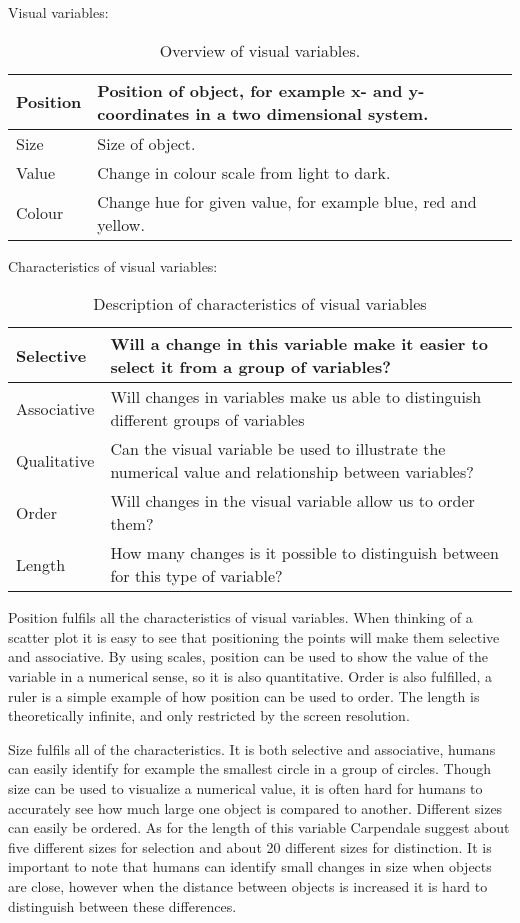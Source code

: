 Visual variables:
\begin{table}[h!]
  \begin{tabular}{|l|p{10cm}|}
      \hline
      Position    & Position of object, for example x- and y-coordinates in a two dimensional system. \\ \hline
      Size        & Size of object. \\ \hline
      Value       & Change in colour scale from light to dark. \\ \hline
      Colour      & Change hue for given value, for example blue, red and yellow. \\ \hline
  \end{tabular}
  \caption{Overview of visual variables.}
\end{table}

Characteristics of visual variables:
\begin{table}[h!]
  \begin{tabular}{|l|p{10cm}|}
      \hline
      Selective   & Will a change in this variable make it easier to select it from a group of variables? \\ \hline
        Associative & Will changes in variables make us able to distinguish different groups of variables \\ \hline 
        Qualitative & Can the visual variable be used to illustrate the numerical value and relationship between variables? \\ \hline
        Order       & Will changes in the visual variable allow us to order them? \\ \hline
        Length      & How many changes is it possible to distinguish between for this type of variable? \\ \hline
    \end{tabular}
    \caption{Description of characteristics of visual variables}
\end{table}

Position fulfils all the characteristics of visual variables. When thinking of a scatter plot it is easy to see that positioning the points will make them selective and associative. By using scales, position can be used to show the value of the variable in a numerical sense, so it is also quantitative. Order is also fulfilled, a ruler is a simple example of how position can be used to order. The length is theoretically infinite, and only restricted by the screen resolution.

Size fulfils all of the characteristics. It is both selective and associative, humans can easily identify for example the smallest circle in a group of circles. Though size can be used to visualize a numerical value, it is often hard for humans to accurately see how much large one object is compared to another. Different sizes can easily be ordered. As for the length of this variable Carpendale suggest about five different sizes for selection and about 20 different sizes for distinction. It is important to note that humans can identify small changes in size when objects are close, however when the distance between objects is increased it is hard to distinguish between these differences.

